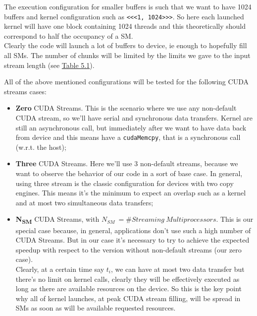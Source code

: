 \begin{enumerate}
		The execution configuration for smaller buffers is such that we want to have 1024 buffers and kernel configuration such as \texttt{<<<1, 1024>>>}. 
		So here each launched kernel will have one block containing 1024 threads and this theoretically should correspond to half the occupancy of a SM.\\
		Clearly the code will launch a lot of buffers to device, ie enough to hopefully fill all SMs. The number of chunks will be limited by the limits we gave to the input stream length (see \hyperref[tab:cosdata]{Table 5.1}).
		
		All of the above mentioned configurations will be tested for the following CUDA streams cases:		
		\begin{itemize}
			\item \textbf{Zero} CUDA Streams. This is the scenario where we use any non-default CUDA stream, so we'll have serial and synchronous data transfers. Kernel are still an asynchronous call, but immediately after we want to have data back from device and this means have a \texttt{cudaMemcpy}, that is a synchronous call (w.r.t. the host);
			\item \textbf{Three} CUDA Streams. Here we'll use 3 non-default streams, because we want to observe the behavior of our code in a sort of base case. In general, using three stream is the classic configuration for devices with two copy engines. This means it's the minimum to expect an overlap such as a kernel and at most two simultaneous data transfers;
			\item \textbf{N\textsubscript{SM}} CUDA Streams, with \(N_{SM}\ =\#Streaming \ Multiprocessors\). This is our special case because, in general, applications don't use such a high number of CUDA Streams. But in our case it's necessary to try to achieve the expected speedup with respect to the version without non-default streams (our zero case).\\
			Clearly, at a certain time say \(t_{i}\), we can have at most two data transfer but there's no limit on kernel calls, clearly they will be effectively executed as long as there are available resources on the device. So this is the key point why all of kernel launches, at peak CUDA stream filling, will be spread in SMs as soon as will be available requested resources.
		\end{itemize}
		

\end{enumerate}
